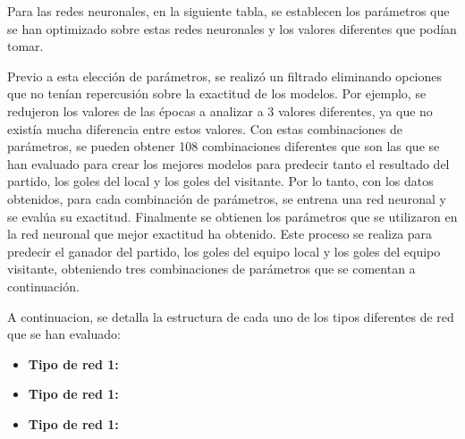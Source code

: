 Para las redes neuronales, en la siguiente tabla, se establecen los parámetros que se han optimizado sobre estas redes neuronales y los valores diferentes que podían tomar.


Previo a esta elección de parámetros, se realizó un filtrado eliminando opciones que no tenían 
repercusión sobre la exactitud de los modelos. Por ejemplo, se redujeron los valores de las épocas 
a analizar a 3 valores diferentes, ya que no existía mucha diferencia entre estos valores. Con estas 
combinaciones de parámetros, se pueden obtener 108 combinaciones diferentes que son las que 
se han evaluado para crear los mejores modelos para predecir tanto el resultado del partido, los 
goles del local y los goles del visitante. Por lo tanto, con los datos obtenidos, para cada 
combinación de parámetros, se entrena una red neuronal y se evalúa su exactitud. Finalmente se 
obtienen los parámetros que se utilizaron en la red neuronal que mejor exactitud ha obtenido. Este 
proceso se realiza para predecir el ganador del partido, los goles del equipo local y los goles del 
equipo visitante, obteniendo tres combinaciones de parámetros que se comentan a continuación.

A continuacion, se detalla la estructura de cada uno de los tipos diferentes de red que se han evaluado:
\begin{itemize}
    \item \textbf{Tipo de red 1:}
    \item \textbf{Tipo de red 1:}
    \item \textbf{Tipo de red 1:}
    
\end{itemize}

